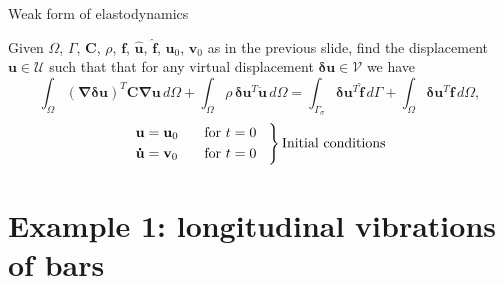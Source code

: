 \documentclass[aspectratio=169]{beamer}
\begin{document}
{
\begin{frame}{Weak form of elastodynamics}
  \begin{block}{}
    Given $\Omega$, $\Gamma$, $\mathbf C$, $\rho$, $\mathbf f$, $\mathbf{\hat u}$, $\mathbf{\hat f}$, $\mathbf u_{0}$, $\mathbf v_{0}$ as in the previous slide, find the displacement $\mathbf u\in \mathcal U$ such that  that for any virtual displacement $\boldsymbol\delta\mathbf u\in \mathcal V$ we have
    $$\int_\Omega (\boldsymbol\nabla \boldsymbol\delta\mathbf u)^{T} \mathbf C\boldsymbol\nabla \mathbf u\, d\Omega+\int_\Omega\rho\, \boldsymbol\delta\mathbf u^{T}\mathbf{\ddot{u}}\, d\Omega=\int_{\Gamma_\sigma} \boldsymbol\delta\mathbf u^{T}\mathbf{\hat f} \, d\Gamma+\int_\Omega \boldsymbol\delta\mathbf u^{T}\mathbf f\, d\Omega,$$
    {\small$$\begin{rcases}\begin{aligned}
               & \mathbf u=\mathbf u_0\hspace{0.3cm}       & \text{for } t=0 \hspace{0.3cm} \\
               & \mathbf{\dot u}=\mathbf v_0\hspace{0.3cm} & \text{for } t=0\hspace{0.3cm}
            \end{aligned}
          \end{rcases}\text{Initial conditions}$$}
  \end{block}
\end{frame}
}

\section{Example 1: longitudinal vibrations of bars}
\end{document}
